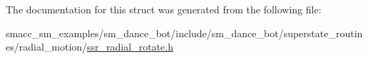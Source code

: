 The documentation for this struct was generated from the following file\+:\begin{DoxyCompactItemize}
\item 
smacc\+\_\+sm\+\_\+examples/sm\+\_\+dance\+\_\+bot/include/sm\+\_\+dance\+\_\+bot/superstate\+\_\+routines/radial\+\_\+motion/\hyperlink{ssr__radial__rotate_8h}{ssr\+\_\+radial\+\_\+rotate.\+h}\end{DoxyCompactItemize}
